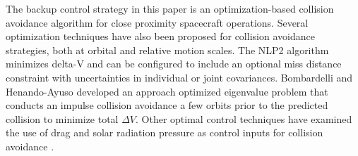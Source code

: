 \documentclass[twocolumn,letterpaper]{IEEEAerospaceCLS}  %
\theoremstyle{definition}
\begin{document}
The backup control strategy in this paper is an optimization-based collision avoidance algorithm for close proximity spacecraft operations. Several optimization techniques have also been proposed for collision avoidance strategies, both at orbital and relative motion scales. The NLP2 algorithm \cite{kelly2005probability} minimizes delta-V and can be configured to include an optional miss distance constraint with uncertainties in individual or joint covariances. Bombardelli and Henando-Ayuso \cite{bombardelli2015optimal} developed an approach optimized eigenvalue problem that conducts an impulse collision avoidance a few orbits prior to the predicted collision to minimize total $\Delta V$. %
Other optimal control techniques have examined the use of drag and solar radiation pressure as control inputs for collision avoidance \cite{mishne2017collision}. %
\end{document}
